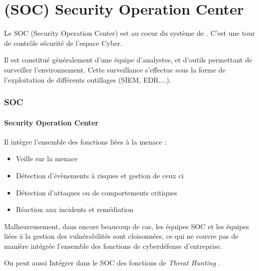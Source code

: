 
\section{(SOC) Security Operation Center}

Le SOC (Security Operation Center) est au coeur du système de . C'est une tour de contrôle sécurité de l'espace Cyber.

Il est constitué généralement d'une équipe d'analystes, et d'outils permettant de surveiller l'environnement. Cette surveillance s'effectue sous la forme de l'exploitation de différents outillages (SIEM, EDR....).


\begin{frame}
\frametitle<presentation>{SOC}
\framesubtitle<presentation>{Security Operation Center}

Il intègre l'ensemble des fonctions liées à la menace :

\begin{itemize}
  \item Veille sur la menace
  \item Détection d'évènements à risques et gestion de ceux ci
  \item Détection d'attaques ou de comportements critiques
  \item Réaction aux incidents et remédiation
\end{itemize}

\end{frame}

Malheureusement, dans encore beaucoup de cas, les équipes SOC et les équipes liées à la gestion des vulnérabilités sont cloisonnées, ce qui ne couvre pas de manière intégrée l'ensemble des fonctions de cyberdéfense d'entreprise.

On peut aussi Intégrer dans  le SOC des fonctions de  \textit{Threat Hunting }.

